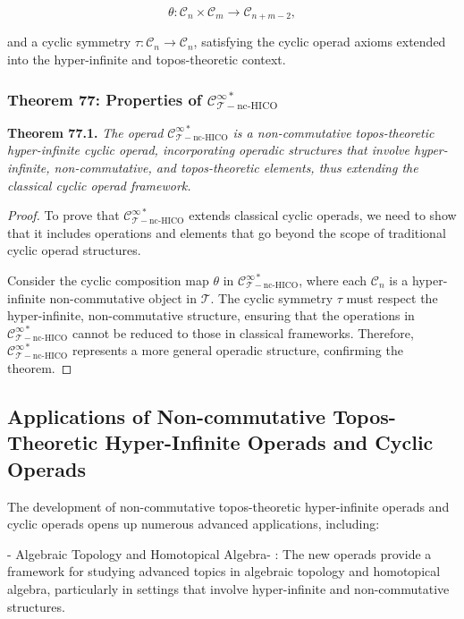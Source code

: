 \documentclass{article}
\begin{document}
\[
\theta: \mathcal{C}_{n} \times \mathcal{C}_{m} \to \mathcal{C}_{n+m-2},
\]

and a cyclic symmetry \( \tau: \mathcal{C}_n \to \mathcal{C}_n \), satisfying the cyclic operad axioms extended into the hyper-infinite and topos-theoretic context.

\subsubsection{Theorem 77: Properties of \(\mathcal{C}_{\mathcal{T}-\text{nc-HICO}}^{\infty *}\)}
\textbf{Theorem 77.1.} \textit{The operad \(\mathcal{C}_{\mathcal{T}-\text{nc-HICO}}^{\infty *}\) is a non-commutative topos-theoretic hyper-infinite cyclic operad, incorporating operadic structures that involve hyper-infinite, non-commutative, and topos-theoretic elements, thus extending the classical cyclic operad framework.}

\begin{proof}
To prove that \(\mathcal{C}_{\mathcal{T}-\text{nc-HICO}}^{\infty *}\) extends classical cyclic operads, we need to show that it includes operations and elements that go beyond the scope of traditional cyclic operad structures.

Consider the cyclic composition map \(\theta\) in \(\mathcal{C}_{\mathcal{T}-\text{nc-HICO}}^{\infty *}\), where each \(\mathcal{C}_n\) is a hyper-infinite non-commutative object in \(\mathcal{T}\). The cyclic symmetry \(\tau\) must respect the hyper-infinite, non-commutative structure, ensuring that the operations in \(\mathcal{C}_{\mathcal{T}-\text{nc-HICO}}^{\infty *}\) cannot be reduced to those in classical frameworks. Therefore, \(\mathcal{C}_{\mathcal{T}-\text{nc-HICO}}^{\infty *}\) represents a more general operadic structure, confirming the theorem.
\end{proof}

\subsection{Applications of Non-commutative Topos-Theoretic Hyper-Infinite Operads and Cyclic Operads}
The development of non-commutative topos-theoretic hyper-infinite operads and cyclic operads opens up numerous advanced applications, including:

-  Algebraic Topology and Homotopical Algebra- : The new operads provide a framework for studying advanced topics in algebraic topology and homotopical algebra, particularly in settings that involve hyper-infinite and non-commutative structures.
\end{document}
